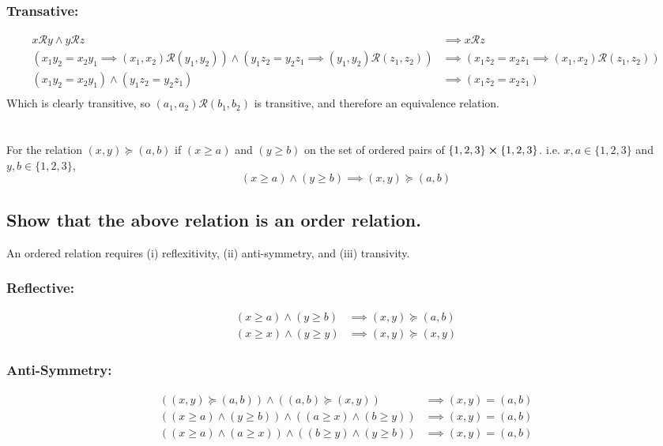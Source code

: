 \documentclass[]{article}
\newcommand{\Rel}{\mathcal{R}}
\begin{document}
\subsubsection{Transative:}
\begin{align*}
	x \Rel y \land y \Rel z
		&\implies x \Rel z\\
	(x_1 y_2 = x_2 y_1 \implies (x_1, x_2) \Rel (y_1, y_2))
	\land (y_1 z_2 = y_2 z_1 \implies (y_1, y_2) \Rel (z_1, z_2))
	&\implies (x_1 z_2 = x_2 z_1 \implies (x_1, x_2) \Rel (z_1, z_2))\\
	(x_1 y_2 = x_2 y_1) \land (y_1 z_2 = y_2 z_1)
	&\implies (x_1 z_2 = x_2 z_1)\\
\end{align*}
Which is clearly transitive, so $(a_1,a_2) \Rel (b_1,b_2)$ is transitive, and therefore 
an equivalence relation.

\newpage
\section{}
For the relation $(x,y) \succeq (a,b)$ if $(x \geq a)$ and $(y \geq b)$ on the set 
of ordered pairs of $\{1,2,3\} \cross \{1,2,3\}$.
i.e. $x,a \in \{1,2,3\}$ and $y,b \in \{1,2,3\}$,
$$(x \geq a) \land (y \geq b) \implies (x,y) \succeq (a,b)$$

\subsection{Show that the above relation is an order relation.}
An ordered relation requires (i) reflexitivity, (ii) anti-symmetry, and (iii) transivity.

\subsubsection{Reflective:}
\begin{align*}
	(x \geq a) \land (y \geq b) 
		&\implies (x,y) \succeq (a,b)\\
	(x \geq x) \land (y \geq y) 
		&\implies (x,y) \succeq (x,y)
\end{align*}

\subsubsection{Anti-Symmetry:}
\begin{align*}
	((x,y) \succeq (a,b)) \land ((a,b) \succeq (x,y))
		&\implies (x,y) = (a,b)\\
	((x \geq a) \land (y \geq b)) \land ((a \geq x) \land (b \geq y))
		&\implies (x,y) = (a,b)\\
	((x \geq a) \land (a \geq x)) \land ((b \geq y) \land (y \geq b))
		&\implies (x,y) = (a,b)
\end{align*}
\end{document}
